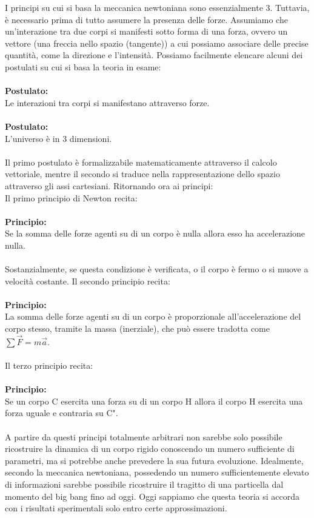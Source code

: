 \documentclass[]{article}
\begin{document}
	I principi su cui si basa la meccanica newtoniana sono essenzialmente 3. Tuttavia, è necessario prima di tutto assumere la presenza delle forze. Assumiamo che un'interazione tra due corpi si manifesti sotto forma di una forza, ovvero un vettore (una freccia nello spazio (tangente)) a cui possiamo associare delle precise quantità, come la direzione e l'intensità.		
	Possiamo facilmente elencare alcuni dei postulati su cui si basa la teoria in esame:
	\\\\
	\textbf{Postulato:}\\
	Le interazioni tra corpi si manifestano attraverso forze.
	\\\\
	\textbf{Postulato:}\\
	L'universo è in 3 dimensioni.
	\\\\
	Il primo postulato è formalizzabile matematicamente attraverso il calcolo vettoriale, mentre il secondo si traduce nella rappresentazione dello spazio attraverso gli assi cartesiani.
	Ritornando ora ai principi:\\
	Il primo principio di Newton recita: 
	\\\\
	\textbf{Principio:}\\
	Se la somma delle forze agenti su di un corpo è nulla allora esso ha accelerazione nulla.
	\\\\ 
	Sostanzialmente, se questa condizione è verificata, o il corpo è fermo o si muove a velocità costante. Il secondo principio recita:
	\\\\
	\textbf{Principio:}\\
	La somma delle forze agenti su di un corpo è proporzionale all'accelerazione del corpo stesso, tramite la massa (inerziale), che può essere tradotta come $\sum\vec{F}=m\vec{a}$.
	\\\\
	Il terzo principio recita: \\\\
	\textbf{Principio:}\\
	Se un corpo C esercita una forza su di un corpo H allora il corpo H esercita una forza uguale e contraria su C".
	\\\\
	A partire da questi principi totalmente arbitrari non sarebbe solo possibile ricostruire la dinamica di un corpo rigido conoscendo un numero sufficiente di parametri, ma si potrebbe anche prevedere la sua futura evoluzione. Idealmente, secondo la meccanica newtoniana, possedendo un numero sufficientemente elevato di informazioni sarebbe possibile ricostruire il tragitto di una particella dal momento del big bang fino ad oggi. Oggi sappiamo che questa teoria si accorda con i risultati sperimentali solo entro certe approssimazioni.\\
\end{document}
